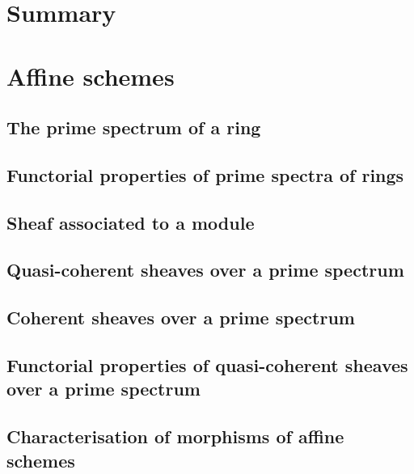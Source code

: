 \documentclass[10pt,oneside]{amsart}
\begin{document}
    \section*{Summary}
    

    \section{Affine schemes}
       
        \subsection{The prime spectrum of a ring}
        
       
        \subsection{Functorial properties of prime spectra of rings}
        
       
        \subsection{Sheaf associated to a module}
        
       
        \subsection{Quasi-coherent sheaves over a prime spectrum}
        
      
        \subsection{Coherent sheaves over a prime spectrum}
        
       
        \subsection{Functorial properties of quasi-coherent sheaves over a prime spectrum}
        
       
        \subsection{Characterisation of morphisms of affine schemes}
        
\end{document}
